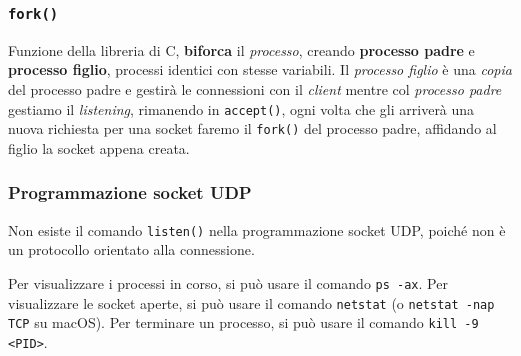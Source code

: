 \subsubsection*{\texttt{fork()}}
Funzione della libreria di C, \textbf{biforca} il \textit{processo}, creando \textbf{processo padre} e \textbf{processo figlio}, processi identici con stesse variabili. Il \textit{processo figlio} è una \textit{copia} del processo padre e gestirà le connessioni con il \textit{client} mentre col \textit{processo padre} gestiamo il \textit{listening}, rimanendo in \texttt{accept()}, ogni volta che gli arriverà una nuova richiesta per una socket faremo il \texttt{fork()} del processo padre, affidando al figlio la socket appena creata.

\subsubsection{Programmazione socket UDP}
Non esiste il comando \texttt{listen()} nella programmazione socket UDP, poiché non è un protocollo orientato alla connessione.

Per visualizzare i processi in corso, si può usare il comando \texttt{ps -ax}. Per visualizzare le socket aperte, si può usare il comando \texttt{netstat} (o \texttt{netstat -nap TCP} su macOS). Per terminare un processo, si può usare il comando \texttt{kill -9 <PID>}.
